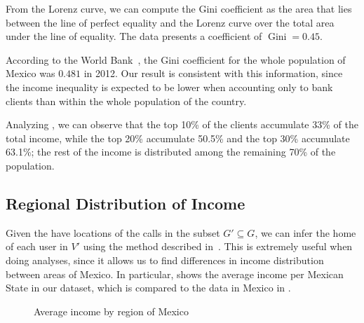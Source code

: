 From the Lorenz curve, we can compute the Gini coefficient as the area that lies between the line of perfect equality and the Lorenz curve over the total area under the line of equality. The data presents a coefficient of $\operatorname{Gini} = 0.45$.

According to the World Bank~\cite{world_bank}, the Gini coefficient for the whole population of Mexico was $0.481$ in 2012. Our result is consistent with this information, since the income inequality is expected to be lower when accounting only to bank clients than within the whole population of the country.

Analyzing , we can observe that the top 10\% of the clients accumulate 33\% of the total income, while the top 20\% accumulate 50.5\% and the top 30\% accumulate 63.1\%; the rest of the income is distributed among the remaining 70\% of the population.

\subsection{Regional Distribution of Income}

Given the have locations of the calls in the subset $G' \subseteq G$, we can infer the home of each user in $V'$ using the method described in~\cite{csaji2013}. This is extremely useful when doing analyses, since it allows us to find differences in income distribution between areas of Mexico. In particular,  shows the average income per Mexican State in our dataset, which is compared to the data in Mexico in .

\begin{figure}
\centering
{}
\caption{Average income by region of Mexico}
\label{fig:regions}
\end{figure}

